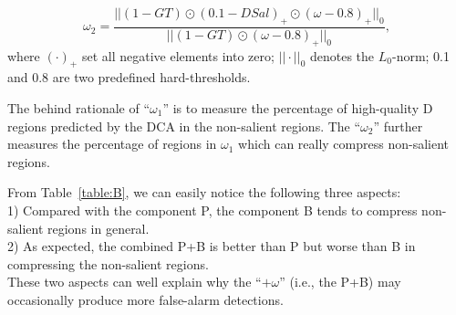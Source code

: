 \documentclass[journal]{IEEEtran}
\begin{document}
\begin{equation}
\label{eq:omega2}
\omega_2 = \frac{||(1-GT)\odot(0.1-DSal)_+\odot(\omega-0.8)_+||_0}{||(1-GT)\odot(\omega-0.8)_+||_0},
\end{equation}
where $(\cdot)_+$ set all negative elements into zero; $||\cdot||_0$ denotes the $L_0$-norm; 0.1 and 0.8 are two predefined hard-thresholds.

The behind rationale of ``$\omega_1$'' is to measure the percentage of high-quality D regions predicted by the DCA in the non-salient regions.
The ``$\omega_2$'' further measures the percentage of regions in $\omega_1$ which can really compress non-salient regions.

From Table~\ref{table:B}, we can easily notice the following three aspects:\\
1) Compared with the component P, the component B tends to compress non-salient regions in general.\\
2) As expected, the combined P+B is better than P but worse than B in compressing the non-salient regions.\\
These two aspects can well explain why the ``$+\omega$'' (i.e., the P+B) may occasionally produce more false-alarm detections.
\end{document}
